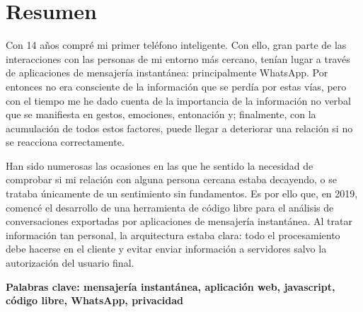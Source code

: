 \cleardoublepage
{}
\chapter*{Resumen}

Con 14 años compré mi primer teléfono inteligente. Con ello, gran parte de las interacciones con las personas de mi entorno más cercano, tenían lugar a través de aplicaciones de mensajería instantánea: principalmente WhatsApp. Por entonces no era consciente de la información que se perdía por estas vías, pero con el tiempo me he dado cuenta de la importancia de la información no verbal que se manifiesta en gestos, emociones, entonación y; finalmente, con la acumulación de todos estos factores, puede llegar a deteriorar una relación si no se reacciona correctamente.

Han sido numerosas las ocasiones en las que he sentido la necesidad de comprobar si mi relación con alguna persona cercana estaba decayendo, o se trataba únicamente de un sentimiento sin fundamentos. Es por ello que, en 2019, comencé el desarrollo de una herramienta de código libre para el análisis de conversaciones exportadas por aplicaciones de mensajería instantánea. Al tratar información tan personal, la arquitectura estaba clara: todo el procesamiento debe hacerse en el cliente y evitar enviar información a servidores salvo la autorización del usuario final.

\vfill
\textbf{Palabras clave: mensajería instantánea, aplicación web, javascript, código libre, WhatsApp, privacidad} 